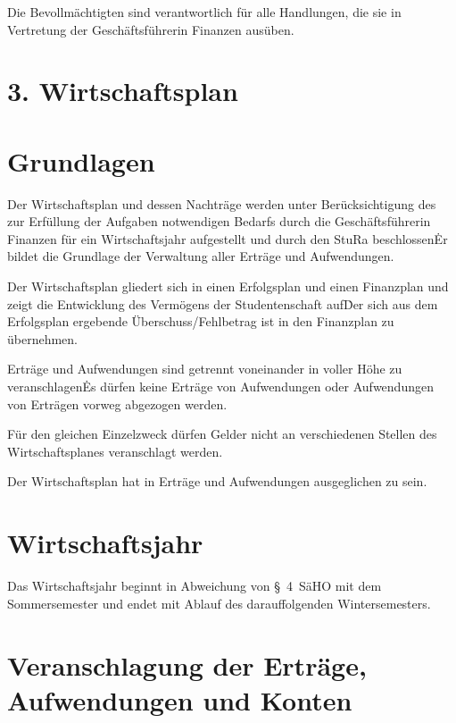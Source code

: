 \Abs \Satz Die Bevollmächtigten sind verantwortlich für alle Handlungen, die sie in Vertretung der Geschäftsführerin Finanzen ausüben.


\section*{3. Wirtschaftsplan}



\section{Grundlagen}

\Abs \Satz Der Wirtschaftsplan und dessen Nachträge werden unter Berücksichtigung des zur Erfüllung der Aufgaben notwendigen Bedarfs durch die Geschäftsführerin Finanzen für ein Wirtschaftsjahr aufgestellt und durch den StuRa beschlossen\. Er bildet die Grundlage der Verwaltung aller Erträge und Aufwendungen.

\Abs \Satz Der Wirtschaftsplan gliedert sich in einen Erfolgsplan und einen Finanzplan und zeigt die Entwicklung des Vermögens der Studentenschaft auf\. Der sich aus dem Erfolgsplan ergebende Überschuss/Fehlbetrag ist in den Finanzplan zu übernehmen.

\Abs \Satz Erträge und Aufwendungen sind getrennt voneinander in voller Höhe zu veranschlagen\. Es dürfen keine Erträge von Aufwendungen oder Aufwendungen von Erträgen vorweg abgezogen werden.

\Abs \Satz Für den gleichen Einzelzweck dürfen Gelder nicht an verschiedenen Stellen des Wirtschaftsplanes veranschlagt werden.

\Abs \Satz Der Wirtschaftsplan hat in Erträge und Aufwendungen ausgeglichen zu sein.



\section{Wirtschaftsjahr}

\Abs \Satz Das Wirtschaftsjahr beginnt in Abweichung von §~4~SäHO mit dem Sommersemester und endet mit Ablauf des darauffolgenden Wintersemesters.



\section{Veranschlagung der Erträge, Aufwendungen und Konten}

